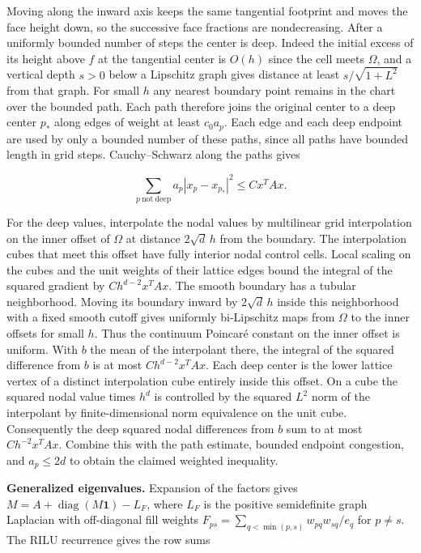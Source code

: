 \documentclass[11pt,a4paper]{article}
\begin{document}
Moving along the inward axis keeps the same tangential footprint and
moves the face height down, so the successive face fractions are
nondecreasing. After a uniformly bounded number of steps the center is
deep. Indeed the initial excess of its height above \(f\) at the
tangential center is \(O(h)\) since the cell meets \(\Omega\), and a
vertical depth \(s>0\) below a Lipschitz graph gives distance at least
\(s/\sqrt{1+L^2}\) from that graph. For small \(h\) any nearest boundary
point remains in the chart over the bounded path. Each path therefore
joins the original center to a deep center \(p_*\) along edges of weight
at least \(c_0a_p\). Each edge and each deep endpoint are used by only a
bounded number of these paths, since all paths have bounded length in
grid steps. Cauchy--Schwarz along the paths gives

\[\sum_{p\ \mathrm{not\ deep}}a_p|x_p-x_{p_*}|^2\le C x^TAx.\]

For the deep values, interpolate the nodal values by multilinear grid
interpolation on the inner offset of \(\Omega\) at distance
\(2\sqrt d\,h\) from the boundary. The interpolation cubes that meet
this offset have fully interior nodal control cells. Local scaling on
the cubes and the unit weights of their lattice edges bound the integral
of the squared gradient by \(C h^{d-2}x^TAx\). The smooth boundary has a
tubular neighborhood. Moving its boundary inward by \(2\sqrt d\,h\)
inside this neighborhood with a fixed smooth cutoff gives uniformly
bi-Lipschitz maps from \(\Omega\) to the inner offsets for small \(h\).
Thus the continuum Poincaré constant on the inner offset is uniform.
With \(b\) the mean of the interpolant there, the integral of the
squared difference from \(b\) is at most \(C h^{d-2}x^TAx\). Each deep
center is the lower lattice vertex of a distinct interpolation cube
entirely inside this offset. On a cube the squared nodal value times
\(h^d\) is controlled by the squared \(L^2\) norm of the interpolant by
finite-dimensional norm equivalence on the unit cube. Consequently the
deep squared nodal differences from \(b\) sum to at most
\(C h^{-2}x^TAx\). Combine this with the path estimate, bounded endpoint
congestion, and \(a_p\le2d\) to obtain the claimed weighted inequality.

\textbf{Generalized eigenvalues.} Expansion of the factors gives
\(M=A+\mathop{\mathrm{diag}}\nolimits(M\mathbf1)-L_F\), where \(L_F\) is
the positive semidefinite graph Laplacian with off-diagonal fill weights
\(F_{ps}=\sum_{q<\min(p,s)} w_{pq}w_{sq}/e_q\) for \(p\ne s\). The RILU
recurrence gives the row sums
\end{document}
